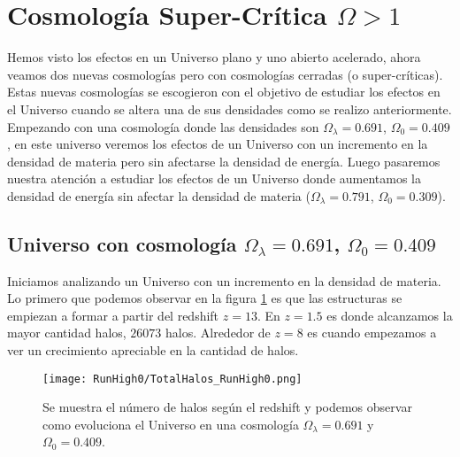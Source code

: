 \section[Cosmología Super-Crítica \texorpdfstring{$\Omega > 1$}{Omega > 1}]{Cosmología Super-Crítica \texorpdfstring{$\Omega > 1$}{Omega > 1}}

\noindent Hemos visto los efectos en un Universo plano y uno abierto acelerado, ahora veamos dos nuevas cosmologías pero con cosmologías cerradas (o super-críticas). Estas nuevas cosmologías se escogieron con el objetivo de estudiar los efectos en el Universo cuando se altera una de sus densidades como se realizo anteriormente. Empezando con una cosmología donde las densidades son $\Omega_\lambda = 0.691$, $\Omega_0 = 0.409$, en este universo veremos los efectos de un Universo con un incremento en la densidad de materia pero sin afectarse la densidad de energía. Luego pasaremos nuestra atención a estudiar los efectos de un Universo donde aumentamos la densidad de energía sin afectar la densidad de materia ($\Omega_\lambda = 0.791$, $\Omega_0 = 0.309$).

\subsection{Universo con cosmología \texorpdfstring{$\Omega_\lambda = 0.691$, $\Omega_0 = 0.409$ }{Omega lambda = 0.691, Omega 0 = 0.409}  }

Iniciamos analizando un Universo con un incremento en la densidad de materia. Lo primero que podemos observar en la figura \ref{fig:High0_TotalHalos} es que las estructuras se empiezan a formar a partir del redshift $z=13$. En $z= 1.5$ es donde alcanzamos la mayor cantidad halos, $26073$ halos. Alrededor de $z = 8$ es cuando empezamos a ver un crecimiento apreciable en la cantidad de halos.

\begin{figure}[H]
    \centering
    \texttt{[image: RunHigh0/TotalHalos\_RunHigh0.png]}
    \caption[Evolución del número de halos en un Universo $\Omega_\lambda = 0.691$, $\Omega_0 = 0.409$]{\footnotesize Se muestra el número de halos según el redshift y podemos observar como evoluciona el Universo en una cosmología $\Omega_\lambda = 0.691$ y $\Omega_0 = 0.409$.}
    \label{fig:High0_TotalHalos}
\end{figure}

